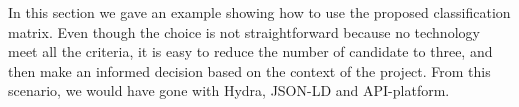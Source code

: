 
In this section we gave an example showing how to use the proposed classification matrix. Even though the choice is not straightforward because no technology meet all the criteria, it is easy to reduce the number of candidate to three, and then make an informed decision based on the context of the project.
From this scenario, we would have gone with Hydra, JSON-LD and API-platform.
